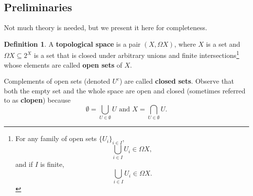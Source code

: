 \documentclass{tufte-handout} %
\theoremstyle{definition}
\newtheorem{defn}[thm]{Definition}
\theoremstyle{remark}
\newcommand{\0}{\textsf{0}}
\newcommand{\1}{\textsf{1}}
\begin{document}
\subsection{Preliminaries}
Not much theory is needed, but we present it here for completeness.
\begin{defn}\label{defn-topspace}
	A \textbf{topological space} is a pair $(X, \Omega X)$, where $X$ is a set and $\Omega X\subseteq 2^X$ is a set that is closed under arbitrary unions and finite intersections\footnote{For any family of open sets $\{U_i\}_{i \in I}$,\[\bigcup_{i \in I} U_i \in \Omega X,\] and if $I$ is finite,\[\bigcup_{i \in I} U_i \in \Omega X.\]} whose elements are called \textbf{open sets} of $X$.
	
	Complements of open sets (denoted $U^c$) are called \textbf{closed sets}. Observe that both the empty set and the whole space are open and closed (sometimes referred to as \textbf{clopen}) because 
	\[\emptyset = \bigcup_{U \in \emptyset} U \text{ and } X = \bigcap_{U \in \emptyset} U.\]
\end{defn}
\end{document}
